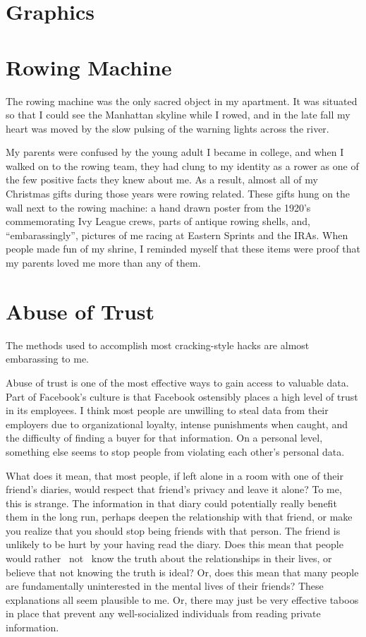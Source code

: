 \documentclass[12pt]{article}
\begin{document}
\section{Graphics}


\section{Rowing Machine}
The rowing machine was the only sacred object in my apartment.  It was situated
so that I could see the Manhattan skyline while I rowed, and in the late fall
my heart was moved by the slow pulsing of the warning lights across the river.

My parents were confused by the young adult I became in college, and when I
walked on to the rowing team, they had clung to my identity as a rower as one of
the few positive facts they knew about me.  As a result, almost all of my
Christmas gifts during those years were rowing related.  These gifts hung on the
wall next to the rowing machine: a hand drawn poster from the 1920's
commemorating Ivy League crews, parts of antique rowing shells, and,
``embarassingly'', pictures of me racing at Eastern Sprints and the IRAs.  When
people made fun of my shrine, I reminded myself that these items were proof that
my parents loved me more than any of them.


\section{Abuse of Trust}
The methods used to accomplish most cracking-style hacks are almost embarassing
to me. 

Abuse of trust is one of the most effective ways to gain access to valuable
data.  Part of Facebook's culture is that Facebook ostensibly places a high
level of trust in its employees.  I think most people are unwilling to steal
data from their employers due to organizational loyalty, intense punishments
when caught, and the difficulty of finding a buyer for that information.  On a
personal level, something else seems to stop people from violating each other's
personal data.

What does it mean, that most people, if left alone in a room with one of their
friend's diaries, would respect that friend's privacy and leave it alone?  To
me, this is strange.  The information in that diary could potentially really
benefit them in the long run, perhaps deepen the relationship with that friend,
or make you realize that you should stop being friends with that person.  The
friend is unlikely to be hurt by your having read the diary.  Does this mean
that people would rather ~not~ know the truth about the relationships in their
lives, or believe that not knowing the truth is ideal?  Or, does this mean that
many people are fundamentally uninterested in the mental lives of their friends?
These explanations all seem plausible to me.  Or, there may just be very
effective taboos in place that prevent any well-socialized individuals from
reading private information.
\end{document}

